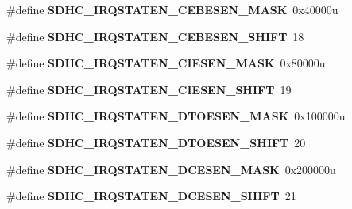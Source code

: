 \begin{DoxyCompactItemize}
\item 
\hypertarget{group___s_d_h_c___register___masks_gadb32296ea39bd0cd1cd2d5719365c49a}{}\#define {\bfseries S\+D\+H\+C\+\_\+\+I\+R\+Q\+S\+T\+A\+T\+E\+N\+\_\+\+C\+E\+B\+E\+S\+E\+N\+\_\+\+M\+A\+S\+K}~0x40000u\label{group___s_d_h_c___register___masks_gadb32296ea39bd0cd1cd2d5719365c49a}

\item 
\hypertarget{group___s_d_h_c___register___masks_ga72fbf9bf13c5e322d4671010c7719927}{}\#define {\bfseries S\+D\+H\+C\+\_\+\+I\+R\+Q\+S\+T\+A\+T\+E\+N\+\_\+\+C\+E\+B\+E\+S\+E\+N\+\_\+\+S\+H\+I\+F\+T}~18\label{group___s_d_h_c___register___masks_ga72fbf9bf13c5e322d4671010c7719927}

\item 
\hypertarget{group___s_d_h_c___register___masks_gaa59f05865a6f6434fd4fcf216a4d522a}{}\#define {\bfseries S\+D\+H\+C\+\_\+\+I\+R\+Q\+S\+T\+A\+T\+E\+N\+\_\+\+C\+I\+E\+S\+E\+N\+\_\+\+M\+A\+S\+K}~0x80000u\label{group___s_d_h_c___register___masks_gaa59f05865a6f6434fd4fcf216a4d522a}

\item 
\hypertarget{group___s_d_h_c___register___masks_ga5db5c25cea330a48bbd4e8439f6eca8d}{}\#define {\bfseries S\+D\+H\+C\+\_\+\+I\+R\+Q\+S\+T\+A\+T\+E\+N\+\_\+\+C\+I\+E\+S\+E\+N\+\_\+\+S\+H\+I\+F\+T}~19\label{group___s_d_h_c___register___masks_ga5db5c25cea330a48bbd4e8439f6eca8d}

\item 
\hypertarget{group___s_d_h_c___register___masks_ga6e36dd46b6990b4b754e5510d1aa2186}{}\#define {\bfseries S\+D\+H\+C\+\_\+\+I\+R\+Q\+S\+T\+A\+T\+E\+N\+\_\+\+D\+T\+O\+E\+S\+E\+N\+\_\+\+M\+A\+S\+K}~0x100000u\label{group___s_d_h_c___register___masks_ga6e36dd46b6990b4b754e5510d1aa2186}

\item 
\hypertarget{group___s_d_h_c___register___masks_gaaa65471aa5dc9354ffbc0f74257c7445}{}\#define {\bfseries S\+D\+H\+C\+\_\+\+I\+R\+Q\+S\+T\+A\+T\+E\+N\+\_\+\+D\+T\+O\+E\+S\+E\+N\+\_\+\+S\+H\+I\+F\+T}~20\label{group___s_d_h_c___register___masks_gaaa65471aa5dc9354ffbc0f74257c7445}

\item 
\hypertarget{group___s_d_h_c___register___masks_ga8a3e8003463ce6afcf39fef7e4938377}{}\#define {\bfseries S\+D\+H\+C\+\_\+\+I\+R\+Q\+S\+T\+A\+T\+E\+N\+\_\+\+D\+C\+E\+S\+E\+N\+\_\+\+M\+A\+S\+K}~0x200000u\label{group___s_d_h_c___register___masks_ga8a3e8003463ce6afcf39fef7e4938377}

\item 
\hypertarget{group___s_d_h_c___register___masks_ga0050daa198388d3a52844f1626e0fd75}{}\#define {\bfseries S\+D\+H\+C\+\_\+\+I\+R\+Q\+S\+T\+A\+T\+E\+N\+\_\+\+D\+C\+E\+S\+E\+N\+\_\+\+S\+H\+I\+F\+T}~21\label{group___s_d_h_c___register___masks_ga0050daa198388d3a52844f1626e0fd75}


\end{DoxyCompactItemize}
